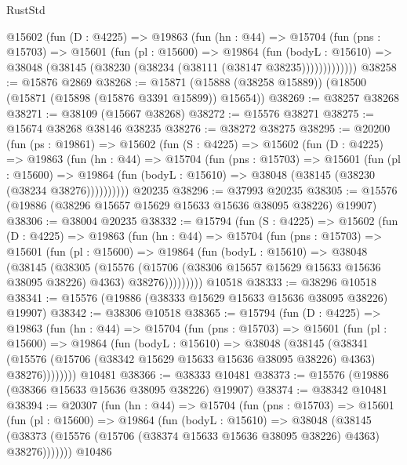 \begin{lexlean}{RustStd}
\begin{coremodule}
        @15602
          (fun (D : @4225) =>
          @19863
            (fun (hn : @44) =>
            @15704
              (fun (pns : @15703) =>
              @15601
                (fun (pl : @15600) =>
                @19864
                  (fun (bodyL : @15610) =>
                  @38048 (@38145 (@38230 (@38234 (@38111 (@38147 @38235)))))))))))))
@38258 := @15876 @2869
@38268 := @15871 (@15888 (@38258 @15889)) (@18500 (@15871 (@15898 (@15876 @3391 @15899)) @15654))
@38269 := @38257 @38268
@38271 := @38109 (@15667 @38268)
@38272 := @15576 @38271
@38275 := @15674 @38268 @38146 @38235
@38276 := @38272 @38275
@38295 := @20200
    (fun (ps : @19861) =>
    @15602
      (fun (S : @4225) =>
      @15602
        (fun (D : @4225) =>
        @19863
          (fun (hn : @44) =>
          @15704
            (fun (pns : @15703) =>
            @15601
              (fun (pl : @15600) =>
              @19864 (fun (bodyL : @15610) => @38048 (@38145 (@38230 (@38234 @38276))))))))))
    @20235
@38296 := @37993 @20235
@38305 := @15576 (@19886 (@38296 @15657 @15629 @15633 @15636 @38095 @38226) @19907)
@38306 := @38004 @20235
@38332 := @15794
    (fun (S : @4225) =>
    @15602
      (fun (D : @4225) =>
      @19863
        (fun (hn : @44) =>
        @15704
          (fun (pns : @15703) =>
          @15601
            (fun (pl : @15600) =>
            @19864
              (fun (bodyL : @15610) =>
              @38048
                (@38145
                  (@38305
                    (@15576
                      (@15706 (@38306 @15657 @15629 @15633 @15636 @38095 @38226) @4363)
                      @38276)))))))))
    @10518
@38333 := @38296 @10518
@38341 := @15576 (@19886 (@38333 @15629 @15633 @15636 @38095 @38226) @19907)
@38342 := @38306 @10518
@38365 := @15794
    (fun (D : @4225) =>
    @19863
      (fun (hn : @44) =>
      @15704
        (fun (pns : @15703) =>
        @15601
          (fun (pl : @15600) =>
          @19864
            (fun (bodyL : @15610) =>
            @38048
              (@38145
                (@38341
                  (@15576 (@15706 (@38342 @15629 @15633 @15636 @38095 @38226) @4363) @38276))))))))
    @10481
@38366 := @38333 @10481
@38373 := @15576 (@19886 (@38366 @15633 @15636 @38095 @38226) @19907)
@38374 := @38342 @10481
@38394 := @20307
    (fun (hn : @44) =>
    @15704
      (fun (pns : @15703) =>
      @15601
        (fun (pl : @15600) =>
        @19864
          (fun (bodyL : @15610) =>
          @38048
            (@38145
              (@38373 (@15576 (@15706 (@38374 @15633 @15636 @38095 @38226) @4363) @38276)))))))
    @10486

\end{coremodule}
\end{lexlean}
